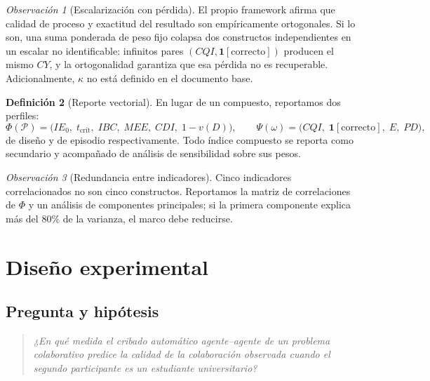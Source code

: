 \documentclass[11pt,a4paper]{article}
\theoremstyle{definition}
\newtheorem{definicion}{Definición}[section]
\theoremstyle{plain}
\theoremstyle{remark}
\newtheorem{observacion}[definicion]{Observación}
\newcommand{\ind}[1]{\mathbf{1}\!\left[#1\right]}
\begin{document}
\begin{observacion}[Escalarización con pérdida]
El propio framework afirma que calidad de proceso y exactitud del resultado son
empíricamente ortogonales. Si lo son, una suma ponderada de peso fijo colapsa dos
constructos independientes en un escalar no identificable: infinitos pares
$(CQI,\ind{\text{correcto}})$ producen el mismo $CY$, y la ortogonalidad garantiza
que esa pérdida no es recuperable. Adicionalmente, $\kappa$ no está definido en el
documento base.
\end{observacion}

\begin{definicion}[Reporte vectorial]\label{def:vectores}
En lugar de un compuesto, reportamos dos perfiles:
\[
  \Phi(\mathcal{P}) = \big(IE_0,\; t_{\mathrm{crit}},\; IBC,\; MEE,\; CDI,\; 1-v(D)\big),
  \qquad
  \Psi(\omega) = \big(CQI,\; \ind{\text{correcto}},\; E,\; PD\big),
\]
de diseño y de episodio respectivamente. Todo índice compuesto se reporta como
secundario y acompañado de análisis de sensibilidad sobre sus pesos.
\end{definicion}

\begin{observacion}[Redundancia entre indicadores]
Cinco indicadores correlacionados no son cinco constructos. Reportamos la matriz
de correlaciones de $\Phi$ y un análisis de componentes principales; si la primera
componente explica más del $80\%$ de la varianza, el marco debe reducirse.
\end{observacion}

\section{Diseño experimental}\label{sec:diseno}

\subsection{Pregunta y hipótesis}

\begin{quote}
\emph{¿En qué medida el cribado automático agente--agente de un problema
colaborativo predice la calidad de la colaboración observada cuando el segundo
participante es un estudiante universitario?}
\end{quote}
\end{document}
